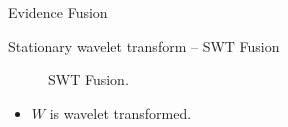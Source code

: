 \documentclass[10pt,professionalfonts]{beamer}
\begin{document}
\begin{frame}[fragile]{Evidence Fusion}
\begin{alertblock}{Stationary wavelet transform -- SWT Fusion}
\begin{figure}[htb!]
\begin{tikzpicture}
\end{tikzpicture}
	\caption{SWT Fusion.}
\label{fig7}
\end{figure}
\begin{itemize}
\vspace{-0.8cm}
\item $W$ is wavelet transformed.
\end{itemize}
\end{alertblock}
\end{frame}




\end{document}

